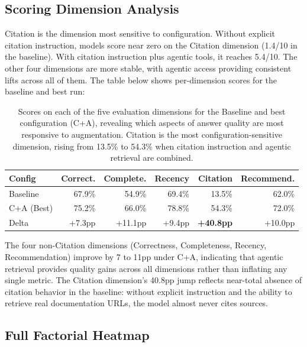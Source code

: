 \documentclass[10pt,letterpaper]{article}
\begin{document}
\subsection{Scoring Dimension Analysis}

Citation is the dimension most sensitive to configuration. Without explicit citation instruction, models score near zero on the Citation dimension (1.4/10 in the baseline). With citation instruction plus agentic tools, it reaches 5.4/10. The other four dimensions are more stable, with agentic access providing consistent lifts across all of them. The table below shows per-dimension scores for the baseline and best run:

\begin{table}[tbp]
\centering
\caption{Scores on each of the five evaluation dimensions for the Baseline and best configuration (C+A), revealing which aspects of answer quality are most responsive to augmentation. Citation is the most configuration-sensitive dimension, rising from 13.5\% to 54.3\% when citation instruction and agentic retrieval are combined.}
\label{tab:dimensions}
\small
\begin{tabular}{l r r r r r}
\toprule
\textbf{Config} & \textbf{Correct.} & \textbf{Complete.} & \textbf{Recency} & \textbf{Citation} & \textbf{Recommend.} \\
\midrule
Baseline        & 67.9\% & 54.9\% & 69.4\% & 13.5\% & 62.0\% \\
C+A (Best)      & 75.2\% & 66.0\% & 78.8\% & 54.3\% & 72.0\% \\
\midrule
Delta              & +7.3pp & +11.1pp & +9.4pp & \textbf{+40.8pp} & +10.0pp \\
\bottomrule
\end{tabular}
\end{table}

The four non-Citation dimensions (Correctness, Completeness, Recency, Recommendation) improve by 7 to 11pp under C+A, indicating that agentic retrieval provides quality gains across all dimensions rather than inflating any single metric. The Citation dimension's 40.8pp jump reflects near-total absence of citation behavior in the baseline: without explicit instruction and the ability to retrieve real documentation URLs, the model almost never cites sources.

\subsection{Full Factorial Heatmap}
\end{document}
